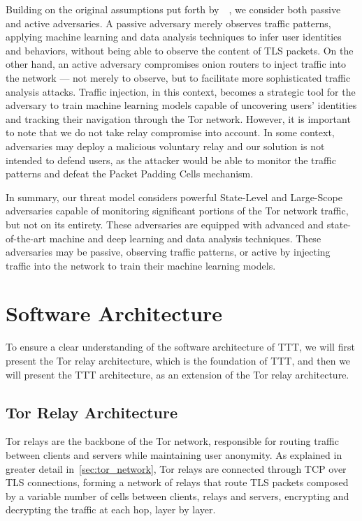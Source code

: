 Building on the original assumptions put forth by~\citeauthor{dingledine2004tor}~\cite{dingledine2004tor}, we consider both passive and active adversaries. A passive adversary merely observes traffic patterns, applying machine learning and data analysis techniques to infer user identities and behaviors, without being able to observe the content of TLS packets. On the other hand, an active adversary compromises onion routers to inject traffic into the network — not merely to observe, but to facilitate more sophisticated traffic analysis attacks. Traffic injection, in this context, becomes a strategic tool for the adversary to train machine learning models capable of uncovering users' identities and tracking their navigation through the Tor network. However, it is important to note that we do not take relay compromise into account. In some context, adversaries may deploy a malicious voluntary relay and our solution is not intended to defend users, as the attacker would be able to monitor the traffic patterns and defeat the Packet Padding Cells mechanism. 


In summary, our threat model considers powerful State-Level and Large-Scope adversaries capable of monitoring significant portions of the Tor network traffic, but not on its entirety. These adversaries are equipped with advanced and state-of-the-art machine and deep learning and data analysis techniques. These adversaries may be passive, observing traffic patterns, or active by injecting traffic into the network to train their machine learning models. 


\section{Software Architecture}\label{sec:software_architecture}

To ensure a clear understanding of the software architecture of TTT, we will first present the Tor relay architecture, which is the foundation of TTT, and then we will present the TTT architecture, as an extension of the Tor relay architecture.

\subsection{Tor Relay Architecture}\label{sec:tor_relay_architecture}
Tor relays are the backbone of the Tor network, responsible for routing traffic between clients and servers while maintaining user anonymity.  As explained in greater detail in~\autoref{sec:tor_network}, Tor relays are connected through TCP over TLS connections, forming a network of relays that route TLS packets composed by a variable number of cells between clients, relays and servers, encrypting and decrypting the traffic at each hop, layer by layer.

